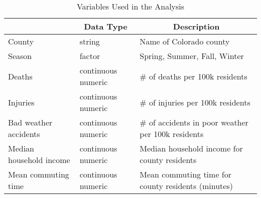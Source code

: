 \begin{table}[h!]
\centering
\begin{tabularx}{\textwidth}{|l|l|X|}
\hline
\rowcolor[HTML]{E7EAF6} 
\multicolumn{1}{|c|}{\textbf{Variable}} & \multicolumn{1}{c|}{\textbf{Data Type}} & \multicolumn{1}{c|}{\textbf{Description}}                     \\ \hline
County                                  & string                                 & Name of Colorado county                                        \\ \hline
Season                                  & factor         & Spring, Summer, Fall, Winter          \\ \hline
Deaths                                  & continuous numeric                     & \# of deaths per 100k residents                                \\ \hline
Injuries                                & continuous numeric & \# of injuries per 100k residents \\ \hline
Bad weather accidents                   & continuous numeric                     & \# of accidents in poor weather per 100k residents            \\ \hline
Median household income                 & continuous numeric & Median household income for county residents \\ \hline
Mean commuting time                     & continuous numeric                     & Mean commuting time for county residents (minutes)            \\ \hline
\end{tabularx}
\caption{Variables Used in the Analysis}
\label{tab:variables}
\end{table}